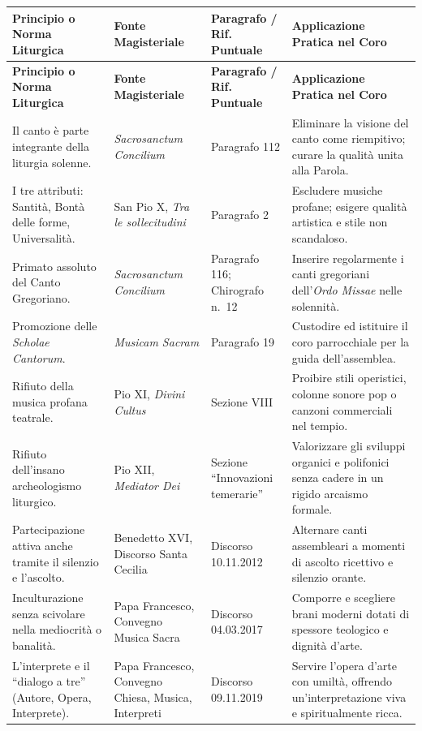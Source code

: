 \documentclass[12pt,a4paper]{article}
\begin{document}
	\begin{longtable}{L{3.5cm}L{2.5cm}L{2.5cm}L{5cm}}
		\toprule
		\textbf{Principio o Norma Liturgica} & \textbf{Fonte Magisteriale} & \textbf{Paragrafo / Rif. Puntuale} & \textbf{Applicazione Pratica nel Coro} \\
		\midrule
		\endfirsthead
		\toprule
		\textbf{Principio o Norma Liturgica} & \textbf{Fonte Magisteriale} & \textbf{Paragrafo / Rif. Puntuale} & \textbf{Applicazione Pratica nel Coro} \\
		\midrule
		\endhead
		\bottomrule
		\endlastfoot
		Il canto è parte integrante della liturgia solenne. & \emph{Sacrosanctum Concilium} & Paragrafo 112 & Eliminare la visione del canto come riempitivo; curare la qualità unita alla Parola. \\
		I tre attributi: Santità, Bontà delle forme, Universalità. & San Pio X, \emph{Tra le sollecitudini} & Paragrafo 2 & Escludere musiche profane; esigere qualità artistica e stile non scandaloso. \\
		Primato assoluto del Canto Gregoriano. & \emph{Sacrosanctum Concilium} & Paragrafo 116; Chirografo n.~12 & Inserire regolarmente i canti gregoriani dell'\emph{Ordo Missae} nelle solennità. \\
		Promozione delle \emph{Scholae Cantorum}. & \emph{Musicam Sacram} & Paragrafo 19 & Custodire ed istituire il coro parrocchiale per la guida dell'assemblea. \\
		Rifiuto della musica profana teatrale. & Pio XI, \emph{Divini Cultus} & Sezione VIII & Proibire stili operistici, colonne sonore pop o canzoni commerciali nel tempio. \\
		Rifiuto dell'insano archeologismo liturgico. & Pio XII, \emph{Mediator Dei} & Sezione ``Innovazioni temerarie'' & Valorizzare gli sviluppi organici e polifonici senza cadere in un rigido arcaismo formale. \\
		Partecipazione attiva anche tramite il silenzio e l'ascolto. & Benedetto XVI, Discorso Santa Cecilia & Discorso 10.11.2012 & Alternare canti assembleari a momenti di ascolto ricettivo e silenzio orante. \\
		Inculturazione senza scivolare nella mediocrità o banalità. & Papa Francesco, Convegno Musica Sacra & Discorso 04.03.2017 & Comporre e scegliere brani moderni dotati di spessore teologico e dignità d'arte. \\
		L'interprete e il ``dialogo a tre'' (Autore, Opera, Interprete). & Papa Francesco, Convegno Chiesa, Musica, Interpreti & Discorso 09.11.2019 & Servire l'opera d'arte con umiltà, offrendo un'interpretazione viva e spiritualmente ricca. \\

\end{longtable}
\end{document}
